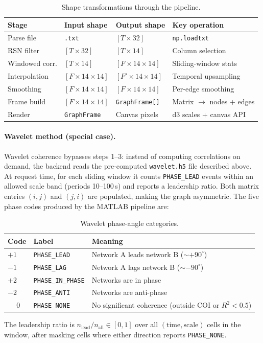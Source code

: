 \documentclass[11pt,a4paper]{article}
\begin{document}
\begin{table}[h]
\centering
\small
\begin{tabularx}{\linewidth}{l l l X}
\toprule
Stage & Input shape & Output shape & Key operation \\
\midrule
Parse file          & \texttt{.txt}         & $[T \times 32]$            & \texttt{np.loadtxt} \\
RSN filter          & $[T \times 32]$       & $[T \times 14]$            & Column selection \\
Windowed corr.      & $[T \times 14]$       & $[F \times 14 \times 14]$  & Sliding-window stats \\
Interpolation       & $[F \times 14 \times 14]$ & $[F' \times 14 \times 14]$ & Temporal upsampling \\
Smoothing           & $[F \times 14 \times 14]$ & $[F \times 14 \times 14]$  & Per-edge smoothing \\
Frame build         & $[F \times 14 \times 14]$ & \texttt{GraphFrame[]}  & Matrix $\rightarrow$ nodes + edges \\
Render              & \texttt{GraphFrame}   & Canvas pixels              & d3 scales + canvas API \\
\bottomrule
\end{tabularx}
\caption{Shape transformations through the pipeline.}
\end{table}

\paragraph{Wavelet method (special case).} Wavelet coherence bypasses
steps 1--3: instead of computing correlations on demand, the backend
reads the pre-computed \texttt{wavelet.h5} file described above. At
request time, for each sliding window it counts
\texttt{PHASE\_LEAD} events within an allowed scale band (periods
10--100\,s) and reports a leadership ratio. Both matrix entries
$(i, j)$ and $(j, i)$ are populated, making the graph asymmetric. The
five phase codes produced by the MATLAB pipeline are:

\begin{table}[h]
\centering
\small
\begin{tabularx}{\linewidth}{l l X}
\toprule
Code & Label & Meaning \\
\midrule
$+1$ & \texttt{PHASE\_LEAD}     & Network A leads network B (${\sim}{+}90^\circ$) \\
$-1$ & \texttt{PHASE\_LAG}      & Network A lags network B (${\sim}{-}90^\circ$) \\
$+2$ & \texttt{PHASE\_IN\_PHASE}& Networks are in phase \\
$-2$ & \texttt{PHASE\_ANTI}     & Networks are anti-phase \\
$\phantom{+}0$ & \texttt{PHASE\_NONE}   & No significant coherence (outside COI or $R^2 < 0.5$) \\
\bottomrule
\end{tabularx}
\caption{Wavelet phase-angle categories.}
\label{tab:phase}
\end{table}

The leadership ratio is $n_{\text{lead}} / n_{\text{all}} \in [0, 1]$
over all $(\text{time}, \text{scale})$ cells in the window, after
masking cells where either direction reports \texttt{PHASE\_NONE}.
\end{document}
